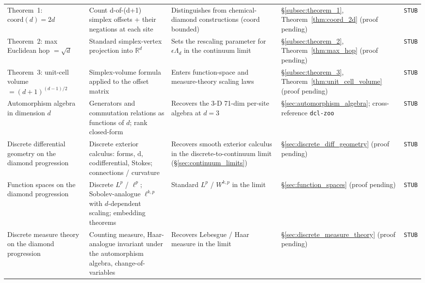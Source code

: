 {\begin{longtable}{@{}p{2.8cm}p{3.8cm}p{3.0cm}p{4.4cm}p{1.0cm}@{}}
Theorem~1: $\text{coord}(d) = 2d$
    & Count d-of-(d+1) simplex offsets + their negations at each site
    & Distinguishes from chemical-diamond constructions (coord bounded)
    & \S\ref{subsec:theorem_1}, Theorem~\ref{thm:coord_2d} (proof pending)
    & \texttt{STUB} \\

Theorem~2: max Euclidean hop $= \sqrt{d}$
    & Standard simplex-vertex projection into $\mathbb{R}^d$
    & Sets the rescaling parameter for $\epsilon \Lambda_d$ in the continuum limit
    & \S\ref{subsec:theorem_2}, Theorem~\ref{thm:max_hop} (proof pending)
    & \texttt{STUB} \\

Theorem~3: unit-cell volume $= (d+1)^{(d-1)/2}$
    & Simplex-volume formula applied to the offset matrix
    & Enters function-space and measure-theory scaling laws
    & \S\ref{subsec:theorem_3}, Theorem~\ref{thm:unit_cell_volume} (proof pending)
    & \texttt{STUB} \\

Automorphism algebra in dimension $d$
    & Generators and commutation relations as functions of $d$; rank closed-form
    & Recovers the 3-D 71-dim per-site algebra at $d=3$
    & \S\ref{sec:automorphism_algebra}; cross-reference \texttt{dcl-zoo}
    & \texttt{STUB} \\

Discrete differential geometry on the diamond progression
    & Discrete exterior calculus: forms, $\mathrm{d}$, codifferential, Stokes; connections / curvature
    & Recovers smooth exterior calculus in the discrete-to-continuum limit (\S\ref{sec:continuum_limits})
    & \S\ref{sec:discrete_diff_geometry} (proof pending)
    & \texttt{STUB} \\

Function spaces on the diamond progression
    & Discrete $L^p$ / $\ell^p$; Sobolev-analogue $\ell^{k,p}$ with $d$-dependent scaling; embedding theorems
    & Standard $L^p$ / $W^{k,p}$ in the limit
    & \S\ref{sec:function_spaces} (proof pending)
    & \texttt{STUB} \\

Discrete measure theory on the diamond progression
    & Counting measure, Haar-analogue invariant under the automorphism algebra, change-of-variables
    & Recovers Lebesgue / Haar measure in the limit
    & \S\ref{sec:discrete_measure_theory} (proof pending)
    & \texttt{STUB} \\


\end{longtable}}
